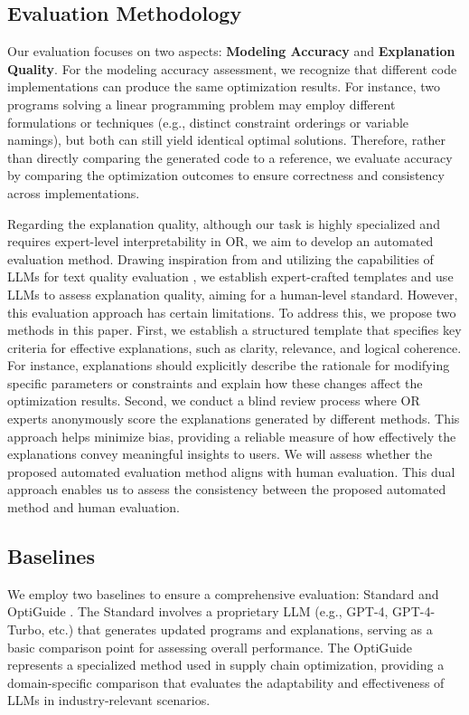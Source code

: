 \subsection{Evaluation Methodology}
\label{sec:evaluation}
Our evaluation focuses on two aspects: \textbf{Modeling Accuracy} and \textbf{Explanation Quality}. For the modeling accuracy assessment, we recognize that different code implementations can produce the same optimization results. For instance, two programs solving a linear programming problem may employ different formulations or techniques (e.g., distinct constraint orderings or variable namings), but both can still yield identical optimal solutions. Therefore, rather than directly comparing the generated code to a reference, we evaluate accuracy by comparing the optimization outcomes to ensure correctness and consistency across implementations.

Regarding the explanation quality, although our task is highly specialized and requires expert-level interpretability in OR, we aim to develop an automated evaluation method. Drawing inspiration from \citep{kondapaneni2024less} and utilizing the capabilities of LLMs for text quality evaluation \citep{chen2023exploring,chiang2023closer,hu2024llm,chu2024better,zytek2024llms}, we establish expert-crafted templates and use LLMs to assess explanation quality, aiming for a human-level standard. However, this evaluation approach has certain limitations. To address this, we propose two methods in this paper. First, we establish a structured template that specifies key criteria for effective explanations, such as clarity, relevance, and logical coherence. For instance, explanations should explicitly describe the rationale for modifying specific parameters or constraints and explain how these changes affect the optimization results. Second, we conduct a blind review process where OR experts anonymously score the explanations generated by different methods. This approach helps minimize bias, providing a reliable measure of how effectively the explanations convey meaningful insights to users. We will assess whether the proposed automated evaluation method aligns with human evaluation. This dual approach enables us to assess the consistency between the proposed automated method and human evaluation.

\subsection{Baselines}
We employ two baselines to ensure a comprehensive evaluation: Standard and OptiGuide \citep{li2023large}. The Standard involves a proprietary LLM (e.g., GPT-4, GPT-4-Turbo, etc.) that generates updated programs and explanations, serving as a basic comparison point for assessing overall performance.
The OptiGuide represents a specialized method used in supply chain optimization, providing a domain-specific comparison that evaluates the adaptability and effectiveness of LLMs in industry-relevant scenarios.

